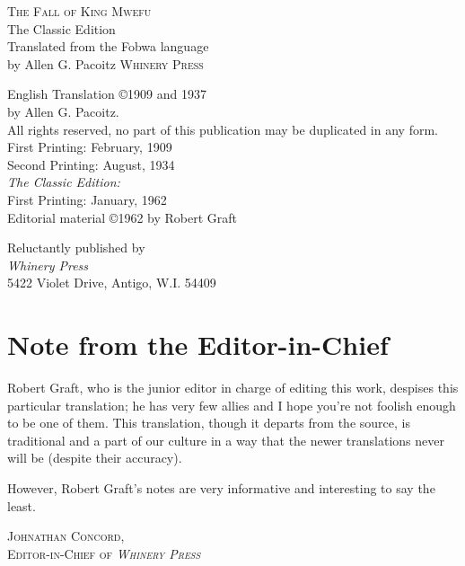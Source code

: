 \frontmatter

\pagestyle{empty}

\begin{center}
\textsc{\LARGE The Fall of King Mwe\-fu}\\
\large The Classic Edition\\[1.5cm]
Translated from the Fo\-bwa language\\ by Allen G. Pa\-co\-itz
\null\vfill
\textsc{Whinery Press}
\end{center}

\break
\null

\break
\null\vfill
\small
{
\noindent
English Translation \copyright 1909 and 1937\\by Allen G. Pa\-co\-itz.\\[0.3cm]
All rights reserved, no part of this publication may be duplicated in any form.\\[1.5cm]

\noindent
First Printing: February, 1909\\
Second Printing: August, 1934\\[0.5cm]

\noindent
\emph{The Classic Edition:} \\
First Printing: January, 1962\\
Editorial material \copyright 1962 by Robert Graft\\[2cm]
}

\noindent
Reluctantly published by\\
\emph{Whinery Press} \\
5422 Violet Drive, Antigo, W.I. 54409

\pagestyle{plain}

\chapter*{Note from the Editor-in-Chief}
Robert Graft, who is the junior editor in charge of editing this work, despises this particular translation; he has very few allies and I hope you're not foolish enough to be one of them. This translation, though it departs from the source, is traditional and a part of our culture in a way that the newer translations never will be (despite their accuracy).

However, Robert Graft's notes are very informative and interesting to say the least.
\begin{flushright}
\textsc{
Johnathan Concord,\\
Editor-in-Chief of \emph{Whinery Press}}
\clearpage
\end{flushright}



